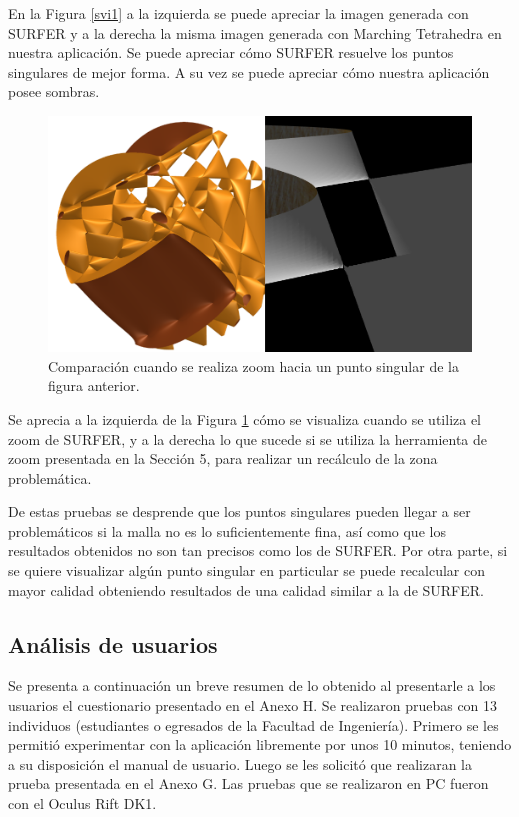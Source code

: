 \documentclass[12pt]{article}
\begin{document}
En la Figura \ref{svi1} a la izquierda se puede apreciar la imagen generada con SURFER y a la derecha la misma imagen generada con Marching Tetrahedra en nuestra aplicación. Se puede apreciar cómo SURFER resuelve los puntos singulares de mejor forma. A su vez se puede apreciar cómo nuestra aplicación posee sombras.
\begin{figure}[h!]
\includegraphics[width=\linewidth]{comp2.png}
\caption{Comparación cuando se realiza zoom hacia un punto singular de la figura anterior.}
\label{svi2}
\end{figure}
Se aprecia a la izquierda de la Figura \ref{svi2} cómo se visualiza cuando se utiliza el zoom de SURFER, y a la derecha lo que sucede si se utiliza la herramienta de zoom presentada en la Sección 5, para realizar un recálculo de la zona problemática. 

De estas pruebas se desprende que los puntos singulares pueden llegar a ser problemáticos si la malla no es lo suficientemente fina, así como que los resultados obtenidos no son tan precisos como los de SURFER. Por otra parte, si se quiere visualizar algún punto singular en particular se puede recalcular con mayor calidad obteniendo resultados de una calidad similar a la de SURFER.

\subsection{Análisis de usuarios}
\noindent Se presenta a continuación un breve resumen de lo obtenido al presentarle a los usuarios el cuestionario presentado en el Anexo H. Se realizaron pruebas con 13 individuos (estudiantes o egresados de la Facultad de Ingeniería). Primero se les permitió experimentar con la aplicación libremente por unos 10 minutos, teniendo a su disposición el manual de usuario. Luego se les solicitó que realizaran la prueba presentada en el Anexo G. Las pruebas que se realizaron en PC fueron con el Oculus Rift DK1.
\end{document}
